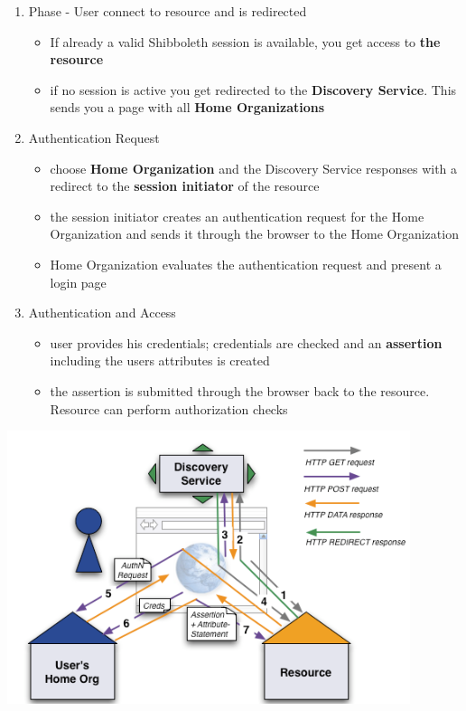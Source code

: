 \documentclass[11pt,twoside,landscape]{article}
\begin{document}
\begin{multicols}{4}
\begin{enumerate}
\item Phase - User connect to resource and is redirected
\begin{itemize}
\item If already a valid Shibboleth session is available, you get access to \textbf{the resource}
\item if no session is active you get redirected to the \textbf{Discovery Service}. This sends you a page with all \textbf{Home Organizations}
\end{itemize}

\item Authentication Request
\begin{itemize}
\item choose \textbf{Home Organization} and the Discovery Service responses with a redirect to the \textbf{session initiator} of the resource
\item the session initiator creates an authentication request for the Home Organization and sends it through the browser to the Home Organization
\item Home Organization evaluates the authentication request and present a login page
\end{itemize}

\item Authentication and Access
\begin{itemize}
\item user provides his credentials; credentials are checked and an \textbf{assertion} including the users attributes is created
\item the assertion is submitted through the browser back to the resource. Resource can perform authorization checks
\end{itemize}
\end{enumerate}


\begin{center}
\includegraphics[width=.9\linewidth]{static/img/cysec/shibboleth.png}
\end{center}


\end{multicols}
\end{document}
